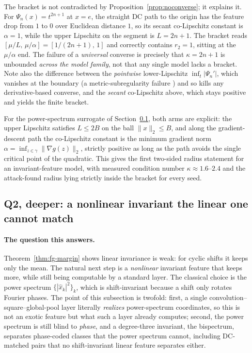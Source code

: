 \begin{remark}
\label{rem:reconcile}
The bracket is not contradicted by Proposition~\ref{prop:noconverse}; it explains it. For
$\Psi_n(x) = t^{2n+1}$ at $x = e$, the straight DC path to the origin has the feature drop from $1$ to
$0$ over Euclidean distance $1$, so its secant co-Lipschitz constant is $\alpha = 1$, while the upper
Lipschitz on the segment is $L = 2n+1$. The bracket reads $[\mu/L,\,\mu/\alpha] = [1/(2n+1),\,1]$ and
correctly contains $r_2 = 1$, sitting at the $\mu/\alpha$ end. The failure of a \emph{universal}
converse is precisely that $\kappa = 2n+1$ is unbounded \emph{across the model family}, not that any
single model lacks a bracket. Note also the difference between the \emph{pointwise} lower-Lipschitz
$\inf_t|\Psi_n'|$, which vanishes at the boundary (a metric-subregularity failure
\citep{dontchev2009}) and so kills any derivative-based converse, and the \emph{secant}
co-Lipschitz above, which stays positive and yields the finite bracket.
\end{remark}

\begin{remark}
For the power-spectrum surrogate of Section~\ref{sub:ps}, both arms are explicit: the upper Lipschitz
satisfies $L \le 2B$ on the ball $\|x\|_2 \le B$, and along the gradient-descent path the
co-Lipschitz constant is the minimum gradient norm $\alpha = \inf_{z\in\gamma}\|\nabla g(z)\|_2$,
strictly positive as long as the path avoids the single critical point of the quadratic. This gives
the first two-sided radius statement for an invariant-feature model, with measured condition number
$\kappa \approx 1.6$--$2.4$ and the attack-found radius lying strictly inside the bracket for every
seed.
\end{remark}


\subsection{Q2, deeper: a nonlinear invariant the linear one cannot match}
\label{sub:ps}

\paragraph{The question this answers.}
Theorem~\ref{thm:fg-margin} shows linear invariance is weak: for cyclic shifts it keeps only the
mean. The natural next step is a \emph{nonlinear} invariant feature that keeps more, while still
being computable by a standard layer. The classical choice is the power spectrum $\{|\hat x_k|^2\}_k$,
which is shift-invariant because a shift only rotates Fourier phases. The point of this subsection is
twofold: first, a single convolution--square--global-pool layer literally \emph{realizes} power-spectrum
coordinates, so this is not an exotic feature but what such a layer already computes; second, the power
spectrum is still blind to \emph{phase}, and a degree-three invariant, the bispectrum, separates
phase-coded classes that the power spectrum cannot, including DC-matched pairs that no shift-invariant linear feature separates either.

